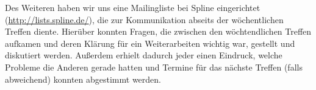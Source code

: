 Des Weiteren haben wir uns eine Mailingliste bei Spline eingerichtet (\url{http://lists.spline.de/}), die zur Kommunikation abseits der wöchentlichen Treffen diente. Hierüber konnten Fragen, die zwischen den wöchtendlichen Treffen aufkamen und deren Klärung für ein Weiterarbeiten wichtig war, gestellt und diskutiert werden. Außerdem erhielt dadurch jeder einen Eindruck, welche Probleme die Anderen gerade hatten und Termine für das nächste Treffen (falls abweichend) konnten abgestimmt werden.
